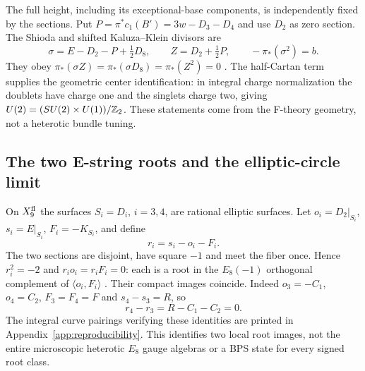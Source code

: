 The full height, including its exceptional-base components,
is independently fixed by the sections. Put
$P=\pi^*c_1(B')=3w-D_3-D_4$ and use $D_2$ as zero section.
The Shioda and shifted Kaluza--Klein divisors are
\begin{equation}
 \sigma=E-D_2-P+\tfrac12D_8,\qquad Z=D_2+\tfrac12P,
 \qquad -\pi_*(\sigma^2)=b.
 \label{eq:x9-shioda-kk}
\end{equation}
They obey $\pi_*(\sigma Z)=\pi_*(\sigma D_8)=\pi_*(Z^2)=0$
\cite{Grimm:2015gka}. The half-Cartan term supplies the
geometric center identification: in integral charge normalization
the doublets have charge one and the singlets charge two,
giving $U(2)=(SU(2)\times U(1))/\mathbb Z_2$. These statements
come from the F-theory geometry, not a heterotic bundle tuning.

\subsection{The two E-string roots and the elliptic-circle limit}
\label{subsec:estring-roots}\label{subsec:finite-circle}

On $X_9^{\rm fl}$ the surfaces $S_i=D_i$, $i=3,4$, are rational
elliptic surfaces. Let $o_i=D_2|_{S_i}$, $s_i=E|_{S_i}$,
$F_i=-K_{S_i}$, and define
\begin{equation}
 r_i=s_i-o_i-F_i.
 \label{eq:x9-estring-roots}
\end{equation}
The two sections are disjoint, have square $-1$ and meet the
fiber once. Hence $r_i^2=-2$ and $r_i o_i=r_i F_i=0$:
each is a root in the $E_8(-1)$ orthogonal complement of
$\langle o_i,F_i\rangle$ \cite{Schutt:2009elliptic}.
Their compact images coincide. Indeed $o_3=-C_1$, $o_4=C_2$,
$F_3=F_4=F$ and $s_4-s_3=R$, so
\begin{equation}
 r_4-r_3=R-C_1-C_2=0.
\end{equation}
The integral curve pairings verifying these identities are
printed in Appendix~\ref{app:reproducibility}. This identifies
two local root images, not the entire microscopic heterotic
$E_8$ gauge algebras or a BPS state for every signed root class.

